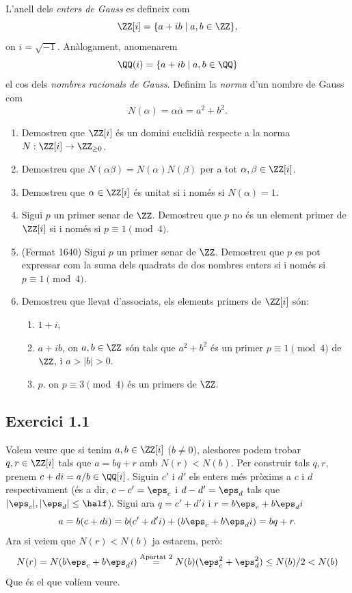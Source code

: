 \documentclass[11pt, a4paper]{article}
\begin{document}
\pagestyle{fancy}
% 
    \begin{tcolorbox}[title=\section{FP1 Exercici 1}]
        L'anell dels \textit{enters de Gauss} es defineix com
        \[
            \ZZ[i]=\{a+ib\mid a,b\in \ZZ\},
        \]
        on $i=\sqrt{-1}$. Anàlogament, anomenarem
        \[
            \QQ(i)=\{a+ib\mid a,b\in \QQ\}
        \]
        el cos dels \textit{nombres racionals de Gauss}. Definim la \textit{norma} d'un nombre de Gauss com 
        \[
            N(\alpha)=\alpha\bar{\alpha}=a^2+b^2.
        \]
        \begin{enumerate}
            \item Demostreu que $\ZZ[i]$ és un domini euclidià respecte a la norma $N:\ZZ[i]\to\ZZ_{\geq0}$.
            \item Demostreu que $N(\alpha\beta)=N(\alpha)N(\beta)$ per a tot $\alpha,\beta\in \ZZ[i]$.
            \item Demostreu que $\alpha\in\ZZ[i]$ és unitat si i només si $N(\alpha)=1$.
            \item Sigui $p$ un primer senar de $\ZZ$. Demostreu que $p$ no és un element primer de $\ZZ[i]$ si i només si $p\equiv1\pmod 4$.
            \item (Fermat 1640) Sigui $p$ un primer senar de $\ZZ$. Demostreu que $p$ es pot expressar com la suma dels quadrats de dos nombres enters si i només si $p\equiv1\pmod4$.
            \item Demostreu que llevat d'associats, els elements primers de $\ZZ[i]$ són:
            \begin{enumerate}
                \item $1+i$,
                \item $a+ib$, on $a,b\in\ZZ$ són tals que $a^2+b^2$ és un primer $p\equiv1\pmod4$ de $\ZZ$, i $a>|b|>0$.
                \item $p$. on $p\equiv3\pmod 4$ és un primers de $\ZZ$.
            \end{enumerate}
        \end{enumerate}
    \end{tcolorbox}
    \subsection{Exercici 1.1}
    Volem veure que si tenim $a,b\in\ZZ[i]$ ($b\neq0$), aleshores podem trobar $q,r\in \ZZ[i]$ tals que $a=bq+r$ amb $N(r)<N(b)$. Per construir tals $q,r$, prenem $c+di=a/b\in\QQ[i]$. Siguin $c'$ i $d'$ els enters més pròxims a $c$ i $d$ respectivament (és a dir, $c-c'=\eps_c$ i $d-d'=\eps_d$ tals que $|\eps_c|, |\eps_d|\leq\half$). Sigui ara $q=c'+d'i$ i $r=b\eps_c+b\eps_di$
    \[
        a=b(c+di)=b(c'+d'i)+ (b\eps_c+b\eps_di)=bq+r.
    \]
    Ara si veiem que $N(r)<N(b)$ ja estarem, però:
    \[
        N(r)=N(b\eps_c+b\eps_di)\overset{\text{Apartat }2}{=}N(b)(\eps_c^2+\eps_d^2)\leq N(b)/2< N(b)
    \]
    Que és el que volíem veure.
\end{document}
